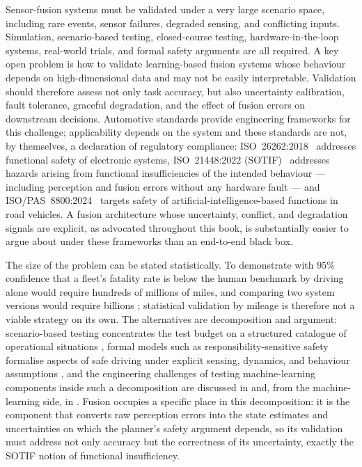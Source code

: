Sensor-fusion systems must be validated under a very large scenario space, including rare events, sensor failures, degraded sensing, and conflicting inputs. Simulation, scenario-based testing, closed-course testing, hardware-in-the-loop systems, real-world trials, and formal safety arguments are all required. A key open problem is how to validate learning-based fusion systems whose behaviour depends on high-dimensional data and may not be easily interpretable. Validation should therefore assess not only task accuracy, but also uncertainty calibration, fault tolerance, graceful degradation, and the effect of fusion errors on downstream decisions. Automotive standards provide engineering frameworks for this challenge; applicability depends on the system and these standards are not, by themselves, a declaration of regulatory compliance: ISO~26262:2018~\cite{iso26262_2018} addresses functional safety of electronic systems, ISO~21448:2022 (SOTIF)~\cite{iso21448_2022} addresses hazards arising from functional insufficiencies of the intended behaviour --- including perception and fusion errors without any hardware fault --- and ISO/PAS~8800:2024~\cite{iso8800_2024} targets safety of artificial-intelligence-based functions in road vehicles. A fusion architecture whose uncertainty, conflict, and degradation signals are explicit, as advocated throughout this book, is substantially easier to argue about under these frameworks than an end-to-end black box. %

The size of the problem can be stated statistically. To demonstrate with $95\%$ confidence that a fleet's fatality rate is below the human benchmark by driving alone would require hundreds of millions of miles, and comparing two system versions would require billions \cite{kalra2016_miles}; statistical validation by mileage is therefore not a viable strategy on its own. The alternatives are decomposition and argument: scenario-based testing concentrates the test budget on a structured catalogue of operational situations \cite{riedmaier2020_scenario}, formal models such as responsibility-sensitive safety formalise aspects of safe driving under explicit sensing, dynamics, and behaviour assumptions \cite{shalevshwartz2017_rss}, and the engineering challenges of testing machine-learning components inside such a decomposition are discussed in \cite{koopman2016_testing} and, from the machine-learning side, in \cite{amodei2016_concrete}. Fusion occupies a specific place in this decomposition: it is the component that converts raw perception errors into the state estimates and uncertainties on which the planner's safety argument depends, so its validation must address not only accuracy but the correctness of its uncertainty, exactly the SOTIF notion of functional insufficiency.

